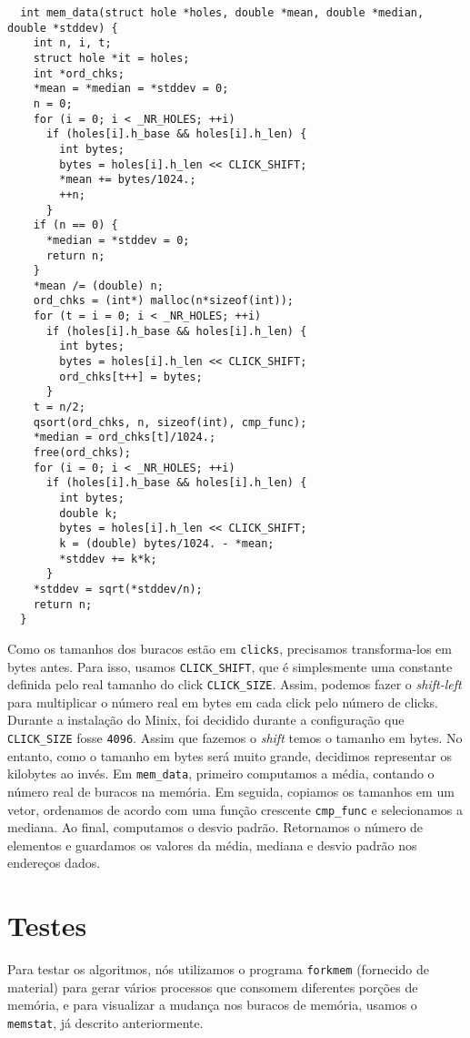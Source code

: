 \documentclass{amsart}
\theoremstyle{plain}
\newcommand{\code}[1]{\lstinline[mathescape=true]{#1}}
\begin{document}
\begin{verbatim}
  int mem_data(struct hole *holes, double *mean, double *median, double *stddev) {
    int n, i, t;
    struct hole *it = holes;
    int *ord_chks;
    *mean = *median = *stddev = 0;
    n = 0;
    for (i = 0; i < _NR_HOLES; ++i)
      if (holes[i].h_base && holes[i].h_len) {
        int bytes;
        bytes = holes[i].h_len << CLICK_SHIFT;
        *mean += bytes/1024.;
        ++n;
      }
    if (n == 0) {
      *median = *stddev = 0;
      return n;
    }
    *mean /= (double) n;
    ord_chks = (int*) malloc(n*sizeof(int));
    for (t = i = 0; i < _NR_HOLES; ++i)
      if (holes[i].h_base && holes[i].h_len) {
        int bytes;
        bytes = holes[i].h_len << CLICK_SHIFT;
        ord_chks[t++] = bytes;
      }
    t = n/2;
    qsort(ord_chks, n, sizeof(int), cmp_func);
    *median = ord_chks[t]/1024.;
    free(ord_chks);
    for (i = 0; i < _NR_HOLES; ++i)
      if (holes[i].h_base && holes[i].h_len) {
        int bytes;
        double k;
        bytes = holes[i].h_len << CLICK_SHIFT;
        k = (double) bytes/1024. - *mean;
        *stddev += k*k;
      }
    *stddev = sqrt(*stddev/n);
    return n;
  }
\end{verbatim}

Como os tamanhos dos buracos estão em \code{clicks}, precisamos transforma-los em bytes antes. Para
isso, usamos \code{CLICK_SHIFT}, que é simplesmente uma constante definida pelo real tamanho do
click \code{CLICK_SIZE}. Assim, podemos fazer o \textit{shift-left} para multiplicar o número real
em bytes em cada click pelo número de clicks. Durante a instalação do Minix, foi decidido durante a
configuração que \code{CLICK_SIZE} fosse \code{4096}. Assim que fazemos o \textit{shift} temos o
tamanho em bytes. No entanto, como o tamanho em bytes será muito grande, decidimos representar os
kilobytes ao invés. Em \code{mem_data}, primeiro computamos a média, contando o número real de
buracos na memória. Em seguida, copiamos os tamanhos em um vetor, ordenamos de acordo com uma
função crescente \code{cmp_func} e selecionamos a mediana. Ao final, computamos o desvio padrão.
Retornamos o número de elementos e guardamos os valores da média, mediana e desvio padrão nos
endereços dados.

\section{Testes}

Para testar os algoritmos, nós utilizamos o programa \code{forkmem} (fornecido de material) para gerar vários processos que consomem diferentes porções de memória, e para visualizar a mudança nos buracos de memória, usamos o \code{memstat}, já descrito anteriormente.
\end{document}
